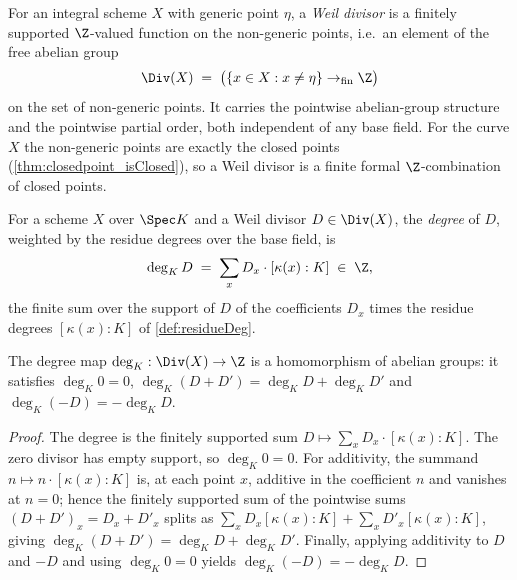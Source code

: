 \begin{definition}
  \label{def:curveDivisor}
  \leanok
  For an integral scheme \(X\) with generic point \(\eta\), a \emph{Weil divisor} is a finitely
  supported \(\Z\)-valued function on the non-generic points, i.e.\ an element of the free abelian
  group
  \[
    \Div(X) \;=\; \bigl(\{ x \in X : x \neq \eta \} \to_{\mathrm{fin}} \Z\bigr)
  \]
  on the set of non-generic points. It carries the pointwise abelian-group structure and the
  pointwise partial order, both independent of any base field. For the curve \(X\) the
  non-generic points are exactly the closed points (\ref{thm:closedpoint_isClosed}), so a Weil
  divisor is a finite formal \(\Z\)-combination of closed points.
\end{definition}

\begin{definition}
  \label{def:curveDivisor_deg}
  \leanok
  For a scheme \(X\) over \(\Spec K\) and a Weil divisor \(D \in \Div(X)\), the \emph{degree} of
  \(D\), weighted by the residue degrees over the base field, is
  \[
    \deg_K D \;=\; \sum_{x} D_x \cdot [\kappa(x) : K] \;\in\; \Z ,
  \]
  the finite sum over the support of \(D\) of the coefficients \(D_x\) times the residue degrees
  \([\kappa(x) : K]\) of \ref{def:residueDeg}.
\end{definition}

\begin{theorem}
  \label{thm:curveDivisor_deg_hom}
  \leanok
  The degree map \(\deg_K : \Div(X) \to \Z\) is a homomorphism of abelian groups: it satisfies
  \(\deg_K 0 = 0\), \(\deg_K(D + D') = \deg_K D + \deg_K D'\) and \(\deg_K(-D) = -\deg_K D\).
\end{theorem}
\begin{proof}
  \leanok
  The degree is the finitely supported sum \(D \mapsto \sum_x D_x \cdot [\kappa(x) : K]\). The
  zero divisor has empty support, so \(\deg_K 0 = 0\). For additivity, the summand
  \(n \mapsto n \cdot [\kappa(x) : K]\) is, at each point \(x\), additive in the coefficient
  \(n\) and vanishes at \(n = 0\); hence the finitely supported sum of the pointwise sums
  \((D + D')_x = D_x + D'_x\) splits as \(\sum_x D_x[\kappa(x):K] + \sum_x D'_x[\kappa(x):K]\),
  giving \(\deg_K(D + D') = \deg_K D + \deg_K D'\). Finally, applying additivity to \(D\) and
  \(-D\) and using \(\deg_K 0 = 0\) yields \(\deg_K(-D) = -\deg_K D\).
\end{proof}

